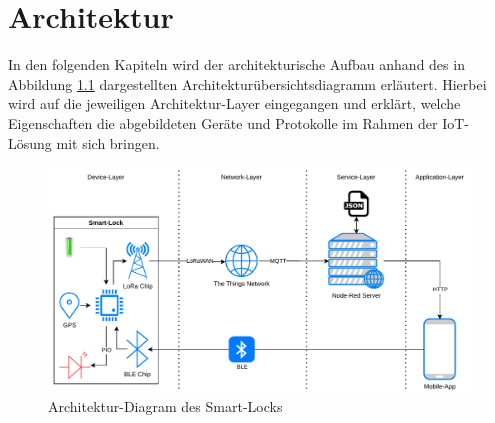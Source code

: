 
\chapter{Architektur}
In den folgenden Kapiteln wird der architekturische Aufbau anhand des in Abbildung \ref{fig:architektur} dargestellten Architekturübersichtsdiagramm 
erläutert. Hierbei wird auf die jeweiligen Architektur-Layer eingegangen und erklärt, welche Eigenschaften die abgebildeten Geräte und Protokolle im Rahmen 
der \ac{IoT}-Lösung mit sich bringen.
\\

\begin{figure}[!htbp]
    \centering
    \includegraphics[width=1\linewidth]{images/architecture_smart_lock.pdf}
    \caption[Architektur-Diagram des Smart-Locks]{Architektur-Diagram des Smart-Locks}
    \label{fig:architektur}
\end{figure}




